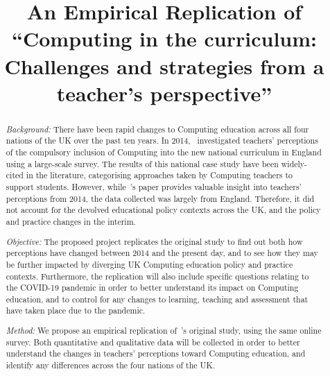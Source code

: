 \documentclass[]{interact}
\theoremstyle{plain}%
\theoremstyle{definition}
\theoremstyle{remark}
\begin{document}

\title{An Empirical Replication of ``Computing in the curriculum:
  Challenges and strategies from a teacher’s perspective''}

\author{
}

\maketitle

\begin{abstract}
{\emph{Background:}} There have been rapid changes to Computing
education across all four nations of the UK over the past ten years.
In 2014,~\citeauthor*{sentance+csizmadia:2017} investigated teachers’
perceptions of the compulsory inclusion of Computing into the new
national curriculum in England using a large-scale survey. The results
of this national case study have been widely-cited in the literature,
categorising approaches taken by Computing teachers to support
students.  However, while~\citeauthor*{sentance+csizmadia:2017}'s
\citeyear{sentance+csizmadia:2017} paper provides valuable insight
into teachers’ perceptions from 2014, the data collected was largely
from England. Therefore, it did not account for the devolved
educational policy contexts across the UK, and the policy and practice
changes in the interim.
 
{\emph{Objective:}} The proposed project replicates the original study
to find out both how perceptions have changed between 2014 and the
present day, and to see how they may be further impacted by diverging
UK Computing education policy and practice contexts. Furthermore, the
replication will also include specific questions relating to the
COVID-19 pandemic in order to better understand its impact on
Computing education, and to control for any changes to learning,
teaching and assessment that have taken place due to the pandemic.
 
{\emph{Method:}} We propose an empirical replication
of~\citeauthor*{sentance+csizmadia:2017}'s
\citeyear{sentance+csizmadia:2017} original study, using the same
online survey. Both quantitative and qualitative data will be
collected in order to better understand the changes in teachers’
perceptions toward Computing education, and identify any differences
across the four nations of the UK.

\end{abstract}
\end{document}
